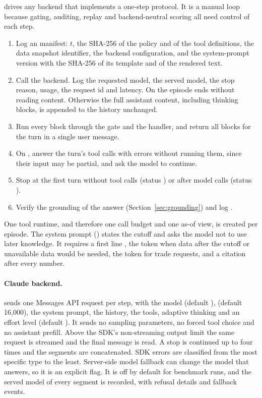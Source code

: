  drives any backend that implements a one-step
 protocol. It is a manual loop because gating, auditing,
replay and backend-neutral scoring all need control of each step.
\begin{enumerate}
  \item Log an  manifest: $t$, the SHA-256 of the policy
  and of the tool definitions, the data snapshot identifier, the backend
  configuration, and the system-prompt version with the SHA-256 of its
  template and of the rendered text.
  \item Call the backend. Log the requested model, the served model, the stop
  reason, usage, the request id and latency. On  the episode
  ends without reading content. Otherwise the full assistant content,
  including thinking blocks, is appended to the history unchanged.
  \item Run every  block through the gate and the handler, and
  return all  blocks for the turn in a single user message.
  \item On , answer the turn's tool calls with
   errors without running them, since their input may
  be partial, and ask the model to continue.
  \item Stop at the first turn without tool calls (status ) or
  after \RunMaxSteps{} model calls (status ).
  \item Verify the grounding of the answer (Section~\ref{sec:grounding}) and
  log .
\end{enumerate}
One tool runtime, and therefore one call budget and one as-of view, is created
per episode. The system prompt (\code{\RunPrompt}) states the cutoff and asks
the model not to use later knowledge. It requires a first line
, the token  when data after the
cutoff or unavailable data would be needed, the token 
for trade requests, and a citation \code{[r:<id>]} after every number.

\paragraph{Claude backend.}
 sends one Messages API request per step, with the
model (default ),  (default 16{,}000),
the system prompt, the history, the tools, adaptive thinking and an effort
level (default ). It sends no sampling parameters, no forced tool
choice and no assistant prefill. Above the SDK's non-streaming output limit
the same request is streamed and the final message is read. A
 stop is continued up to four times and the segments are
concatenated. SDK errors are classified from the most specific type to the
least. Server-side model fallback can change the model that answers, so it is
an explicit flag. It is off by default for benchmark runs, and the served
model of every segment is recorded, with refusal details and fallback
events.

